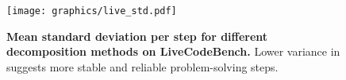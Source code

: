 \begin{figure}[ht]
    \centering
    \texttt{[image: graphics/live\_std.pdf]}
    \caption{\textbf{Mean standard deviation per step for different decomposition methods on LiveCodeBench.} Lower variance in \decomp suggests more stable and reliable problem-solving steps.}
    \label{fig:live_stdstep}
\end{figure}


















